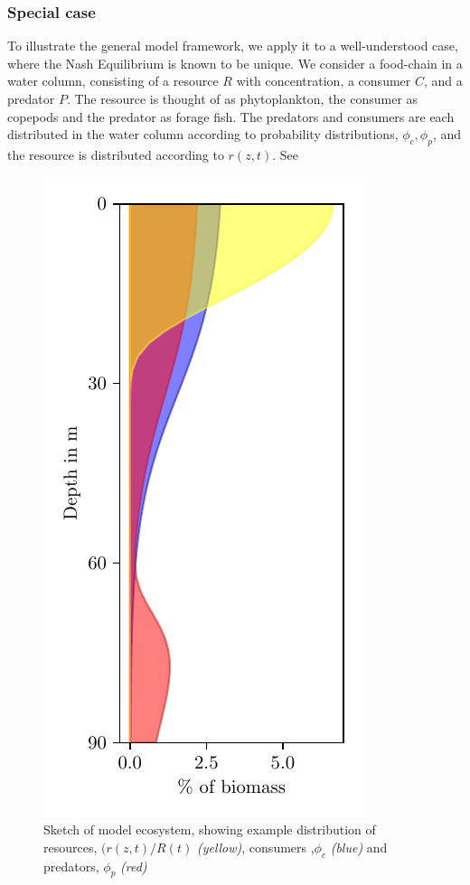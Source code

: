 
\subsubsection*{Special case}
To illustrate the general model framework, we apply it to a well-understood case, where the Nash Equilibrium is known to be unique.
We consider a food-chain in a water column, consisting of a resource $R$ with concentration, a consumer $C$, and a predator $P$. The resource is thought of as phytoplankton, the consumer as copepods and the predator as forage fish. The predators and consumers are each distributed in the water column according to probability distributions, $\phi_c,\phi_p$, and the resource is distributed according to $r(z,t)$. See 
\begin{figure}
 \begin{centering}
   \includegraphics{plots/sketch_for_article.pdf}
 \end{centering}
 \label{fig:model_sketch}
 \caption{Sketch of model ecosystem, showing example distribution of resources, $(r(z,t)/R(t)$ \emph{(yellow)}, consumers ,$\phi_c$ \emph{(blue)} and predators, $\phi_p$ \emph{(red)}}
\end{figure}

